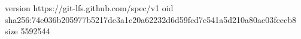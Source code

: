 version https://git-lfs.github.com/spec/v1
oid sha256:74e036b205977b5217de3a1c20a62232d6d59fcd7e541a5d210a80ae03fcecb8
size 5592544
